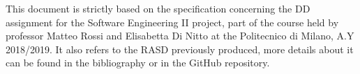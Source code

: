 This document is strictly based on the specification concerning the DD assignment for the Software Engineering II project, part of the course held by professor Matteo Rossi and Elisabetta Di Nitto at the Politecnico di Milano, A.Y 2018/2019. It also refers to the RASD previously produced, more details about it can be found in the bibliography or in the GitHub repository.